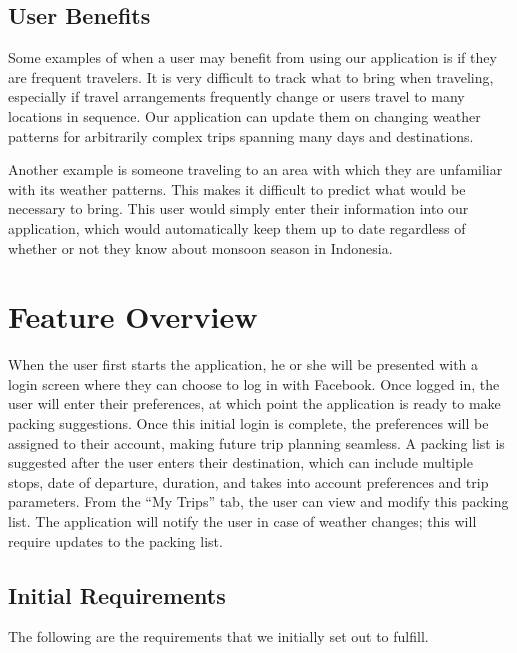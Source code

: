 \documentclass[11pt]{article}
\begin{document}
\subsection{User Benefits}
Some examples of when a user may benefit from using our application is if they are frequent travelers. It is very difficult to track what to bring when traveling, especially if travel arrangements frequently change or users travel to many locations in sequence. Our application can update them on changing weather patterns for arbitrarily complex trips spanning many days and destinations. 

Another example is someone traveling to an area with which they are unfamiliar with its weather patterns. This makes it difficult to predict what would be necessary to bring. This user would simply enter their information into our application, which would automatically keep them up to date regardless of whether or not they know about monsoon season in Indonesia.

\section{Feature Overview} %
    When the user first starts the application, he or she will be presented with a login screen where they can choose to log in with Facebook. Once logged in, the user will enter their preferences, at which point the application is ready to make packing suggestions. Once this initial login is complete, the preferences will be assigned to their account, making future trip planning seamless. A packing list is suggested after the user enters their destination, which can include multiple stops, date of departure, duration, and takes into account preferences and trip parameters. From the ``My Trips'' tab, the user can view and modify this packing list. The application will notify the user in case of weather changes; this will require updates to the packing list.

    \subsection{Initial Requirements}
        The following are the requirements that we initially set out to fulfill. 
\end{document}
